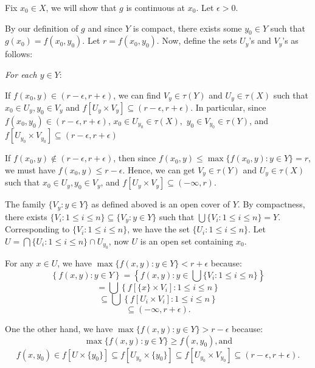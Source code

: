 \documentclass{article}
\begin{document}
Fix $x_0 \in X$, we will show that $g$ is continuous at $x_0$. Let $\epsilon >0$. 

\vskip 10pt


By our definition of $g$ and since $Y$ is compact, there exists some $y_0\in Y$ such that $g(x_0)=f(x_0,y_0)$. Let $r=f(x_0,y_0)$. Now, define the sets $U_y$'s and $V_y$'s as follows:  \vskip 15pt

\emph{For each $y\in Y:$}
\vskip 5pt

If $f(x_0,y) \in (r-\epsilon, r+\epsilon)$, we can find $V_{y} \in \tau(Y) $ and $U_{y} \in \tau(X)$ such that $x_0\in U_y, y_0\in V_{y}$ and $f\left[U_y \times V_y\right] \subseteq (r-\epsilon, r+\epsilon)$. In particular, since $f(x_0,y_0) \in (r-\epsilon, r+\epsilon)$, $x_0\in U_{y_0}\in \tau(X),$ $y_0\in V_{y_0}\in \tau(Y)$, and $f\left[U_{y_0} \times V_{y_0}\right] \subseteq (r-\epsilon, r+\epsilon)$
\vskip 5pt

If $f(x_0,y) \notin (r-\epsilon, r+\epsilon)$, then since $f(x_0,y)\leq \max\{f(x_0,y):y\in Y\}=r$, we must have $f(x_0,y)\leq r-\epsilon$. Hence, we can get $V_{y} \in \tau(Y) $ and $U_{y} \in \tau(X)$ such that  $x_0\in U_y, y_0\in V_{y}$, and $f\left[U_y \times V_y\right] \subseteq (-\infty, r).$ \\

\vskip 12pt

The family $\{V_y: y\in Y\}$ as defined aboved is an open cover of $Y$. By compactness, there exists $\{V_i: 1\leq i \leq n\} \subseteq \{V_y: y\in Y\}$ such that $\bigcup \{V_i: 1\leq i \leq n\} = Y$. Corresponding to $\{V_i: 1\leq i \leq n\}$, we have the set $\{U_i: 1\leq i \leq n\}$. Let $U=\bigcap \{U_i: 1\leq i \leq n\} \cap U_{y_0}$, now $U$ is an open set containing $x_0$. \\

\vskip 5pt

For any $x\in U$, we have $\max\{f(x,y):y\in Y\}<r+\epsilon$ because:
$$\left\{f(x,y):y\in Y\right\} = \left\{f(x,y):y\in \bigcup \{V_i: 1\leq i \leq n\}\right\}$$
$$=\bigcup \left\{f\left[\{x\}\times V_i\right]: 1\leq i\leq n\right\}$$
$$\subseteq \bigcup \left\{f\left[U_i\times V_i\right]: 1\leq i\leq n\right\}$$
$$ \subseteq (-\infty, r+\epsilon).$$

\vskip 20pt

One the other hand, we have $\max\{f(x,y):y\in Y\}>r-\epsilon$ because:
$$\max\{f(x,y):y\in Y\}\geq f(x,y_0), \mbox{and}$$
 $$f(x,y_0)\in f\left[U\times \{y_0\}\right] \subseteq f\left[U_{y_0} \times \{y_0\}\right]
 \subseteq f\left[U_{y_0} \times V_{y_0}\right] \subseteq (r-\epsilon, r+\epsilon).$$
\end{document}
